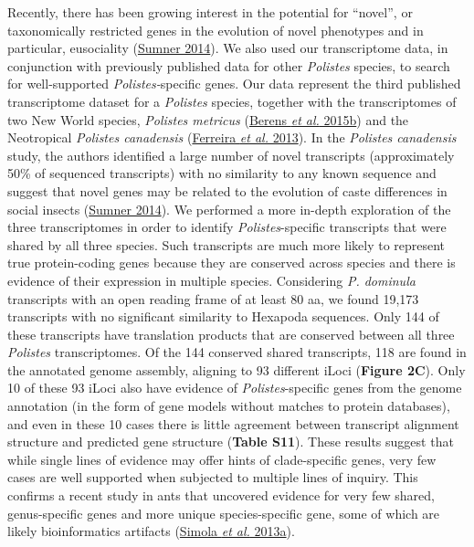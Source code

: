 Recently, there has been growing interest in the potential for
``novel'', or taxonomically restricted genes in the evolution of novel
phenotypes and in particular, eusociality
(\protect\hyperlink{ux5fENREFux5f58}{Sumner 2014}). We also used our
transcriptome data, in conjunction with previously published data for
other \textit{Polistes} species, to search for well-supported
\textit{Polistes-}specific genes. Our data represent the third published
transcriptome dataset for a \textit{Polistes} species, together with the
transcriptomes of two New World species, \textit{Polistes metricus}
(\protect\hyperlink{ux5fENREFux5f3}{Berens \textit{et al.} 2015b}) and the
Neotropical \textit{Polistes canadensis}
(\protect\hyperlink{ux5fENREFux5f10}{Ferreira \textit{et al.} 2013}). In
the \textit{Polistes canadensis} study, the authors identified a large
number of novel transcripts (approximately 50\% of sequenced
transcripts) with no similarity to any known sequence and suggest that
novel genes may be related to the evolution of caste differences in
social insects (\protect\hyperlink{ux5fENREFux5f58}{Sumner 2014}). We
performed a more in-depth exploration of the three transcriptomes in
order to identify \textit{Polistes}-specific transcripts that were shared
by all three species. Such transcripts are much more likely to represent
true protein-coding genes because they are conserved across species and
there is evidence of their expression in multiple species. Considering
\textit{P. dominula} transcripts with an open reading frame of at least 80
aa, we found 19,173 transcripts with no significant similarity to
Hexapoda sequences. Only 144 of these transcripts have translation
products that are conserved between all three \textit{Polistes}
transcriptomes. Of the 144 conserved shared transcripts, 118 are found
in the annotated genome assembly, aligning to 93 different iLoci
(\textbf{Figure 2C}). Only 10 of these 93 iLoci also have evidence of
\textit{Polistes}-specific genes from the genome annotation (in the form
of gene models without matches to protein databases), and even in these
10 cases there is little agreement between transcript alignment
structure and predicted gene structure (\textbf{Table S11}). These
results suggest that while single lines of evidence may offer hints of
clade-specific genes, very few cases are well supported when subjected
to multiple lines of inquiry. This confirms a recent study in ants that
uncovered evidence for very few shared, genus-specific genes and more
unique species-specific gene, some of which are likely bioinformatics
artifacts (\protect\hyperlink{ux5fENREFux5f52}{Simola \textit{et al.}
2013a}).

